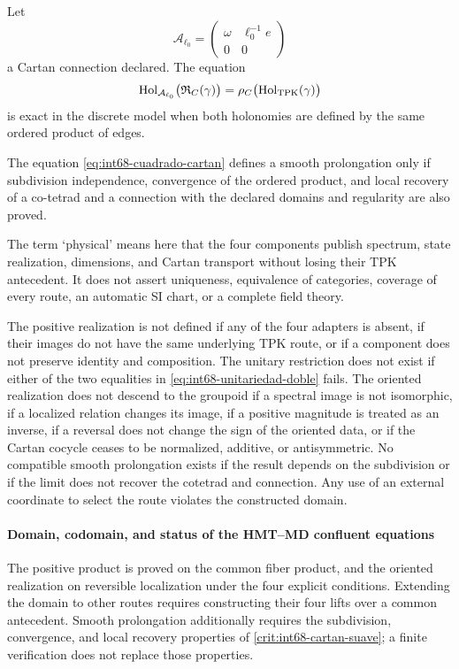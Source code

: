 Let
\[
 \mathcal A_{\ell_0}
 =\begin{pmatrix}\omega&\ell_0^{-1}e\\0&0\end{pmatrix}
\]
a Cartan connection declared. The equation
\begin{equation}
 \operatorname{Hol}_{\mathcal A_{\ell_0}}
   \bigl(\mathfrak R_C(\gamma)\bigr)
 =\rho_C\bigl(\operatorname{Hol}_{\rm TPK}(\gamma)\bigr)
 \label{eq:int68-cuadrado-cartan}
\end{equation}
is exact in the discrete model when both holonomies are defined by the same
ordered product of edges.

\begin{criterion}
\label{crit:int68-cartan-suave}
The equation \eqref{eq:int68-cuadrado-cartan} defines a smooth prolongation only
if subdivision independence, convergence of the ordered
product, and local recovery of a co-tetrad and a connection with
the declared domains and regularity are also proved.
\end{criterion}

The term ‘physical’ means here that the four components publish
spectrum, state realization, dimensions, and Cartan transport without
losing their TPK antecedent\@. It does not assert uniqueness, equivalence of categories,
coverage of every route, an automatic SI chart, or a complete field theory.

\begin{criterion}
\label{crit:int68-obstrucciones-realizacion}
The positive realization is not defined if any of the four
adapters is absent, if their images do not have the same underlying TPK route, or if a
component does not preserve identity and composition. The unitary restriction does not
exist if either of the two equalities in
\eqref{eq:int68-unitariedad-doble} fails. The oriented realization does not descend to the
groupoid if a spectral image is not isomorphic, if a localized relation
changes its image, if a positive magnitude is treated as an inverse, if a
reversal does not change the sign of the oriented data, or if the Cartan
cocycle ceases to be normalized, additive, or antisymmetric. No compatible
smooth prolongation exists if the result depends on the subdivision or if
the limit does not recover the cotetrad and connection. Any use of an external
coordinate to select the route violates the constructed domain.
\end{criterion}

\paragraph{Domain, codomain, and status of the HMT–MD confluent equations}
The positive product is proved on the common fiber product, and the
oriented realization on reversible localization under the four
explicit conditions. Extending the domain to other routes requires constructing their
four lifts over a common antecedent. Smooth prolongation additionally requires
the subdivision, convergence, and local recovery properties of
\cref{crit:int68-cartan-suave}; a finite verification does not replace those
properties.
